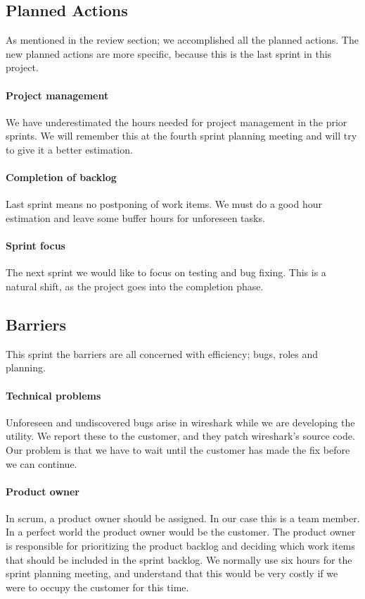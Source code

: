 \subsection{Planned Actions}
As mentioned in the review section; we accomplished all the planned actions. The new planned actions are more specific, because this is the last sprint in this project.

\paragraph{Project management}
We have underestimated the hours needed for project management in the prior sprints. We will remember this at the fourth sprint planning meeting and will try to give it a better estimation.
\paragraph{Completion of backlog}
Last sprint means no postponing of work items. We must do a good hour estimation and leave some buffer hours for unforeseen tasks.
\paragraph{Sprint focus}
The next sprint we would like to focus on testing and bug fixing. This is a natural shift, as the project goes into the completion phase. 

\subsection{Barriers}
This sprint the barriers are all concerned with efficiency; bugs, roles and planning.
\paragraph{Technical problems} 
Unforeseen and undiscovered bugs arise in \Gls{wireshark} while we are developing the \gls{utility}. We report these to the customer, and they patch \Gls{wireshark}'s source code. Our problem is that we have to wait until the customer has made the fix before we can continue.

\paragraph{Product owner}
In \Gls{scrum}, a product owner should be assigned. In our case this is a team member. In a perfect world the product owner would be the customer. The product owner is responsible for prioritizing the product backlog and deciding which work items that should be included in the sprint backlog. We normally use six hours for the sprint planning meeting, and understand that this would be very costly if we were to occupy the customer for this time.

